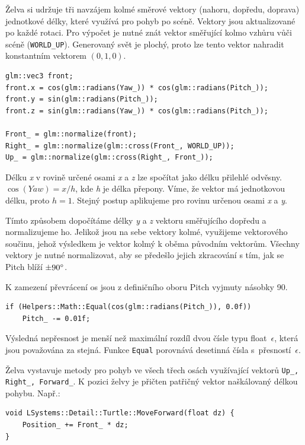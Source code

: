 \documentclass[thesis=M,czech]{FITthesis}[2019/12/23]
\begin{document}
Želva si udržuje tři navzájem kolmé směrové vektory (nahoru, dopředu, doprava) jednotkové délky, které využívá pro pohyb po scéně. Vektory jsou aktualizované po každé rotaci. Pro výpočet je nutné znát vektor směřující kolmo vzhůru vůči scéně (\texttt{WORLD\_UP}). Generovaný svět je plochý, proto lze tento vektor nahradit konstantním vektorem $(0, 1, 0)$.

\begin{verbatim}
glm::vec3 front;
front.x = cos(glm::radians(Yaw_)) * cos(glm::radians(Pitch_));
front.y = sin(glm::radians(Pitch_));
front.z = sin(glm::radians(Yaw_)) * cos(glm::radians(Pitch_));

Front_ = glm::normalize(front);
Right_ = glm::normalize(glm::cross(Front_, WORLD_UP));
Up_ = glm::normalize(glm::cross(Right_, Front_));
\end{verbatim}

Délku \textit{x} v rovině určené osami \textit{x} a \textit{z} lze spočítat jako délku přilehlé odvěsny. $\cos(Yaw) = x / h$, kde \textit{h} je délka přepony. Víme, že vektor má jednotkovou délku, proto $h = 1$. Stejný postup aplikujeme pro rovinu určenou osami \textit{x} a \textit{y}.

Tímto způsobem dopočítáme délky \textit{y} a \textit{z} vektoru směřujícího dopředu a normalizujeme ho. Jelikož jsou na sebe vektory kolmé, využijeme vektorového součinu, jehož výsledkem je vektor kolmý k oběma původním vektorům. Všechny vektory je nutné normalizovat, aby se předešlo jejich zkracování s tím, jak se Pitch blíží $\pm 90\degree$.

K zamezení převrácení os jsou z definičního oboru Pitch vyjmuty násobky 90\degree.

\begin{verbatim}
if (Helpers::Math::Equal(cos(glm::radians(Pitch_)), 0.0f))
    Pitch_ -= 0.01f;
\end{verbatim}

Výsledná nepřesnost je menší než maximální rozdíl dvou čísle typu float~$\epsilon$, která jsou považována za stejná. Funkce \texttt{Equal} porovnává desetinná čísla s~přesností~$\epsilon$.

Želva vystavuje metody pro pohyb ve všech třech osách využívající vektorů \texttt{Up\_, Right\_, Forward\_}. K pozici želvy je přičten patřičný vektor naškálovaný délkou pohybu. Např.:

\begin{verbatim}
void LSystems::Detail::Turtle::MoveForward(float dz) {
    Position_ += Front_ * dz;
}
\end{verbatim}
\end{document}
